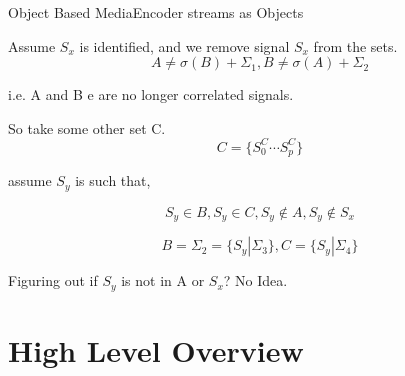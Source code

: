 \documentclass{beamer}
\begin{document}
  \begin{frame}[t]{Object Based Media}{Encoder streams as Objects}
    \begin{theorem}
      Assume $S_{x}$ is identified, and we remove signal $S_{x}$ from the sets.
      \[ A \not= \sigma(B) + \Sigma_{1}, B \not= \sigma(A) + \Sigma_{2}\]

      i.e. A and B e are no longer correlated signals.

      So take some other set C. \[ C = \{S^{C}_{0}\cdots S^{C}_{p}\}\]

      assume $S_{y}$ is such that,

      \[  S_{y} \in B,  S_{y} \in C, S_{y} \not\in A, S_{y} \not\in S_{x}\]

      \[ B = \Sigma_{2}= \{S_{y}|\Sigma_{3}\}, C = \{S_{y}|\Sigma_{4}\}\]

      Figuring out if $S_{y}$ is not in A or $S_{x}$? No Idea.
    \end{theorem}
  \end{frame}
  \section{High Level Overview}
\end{document}
